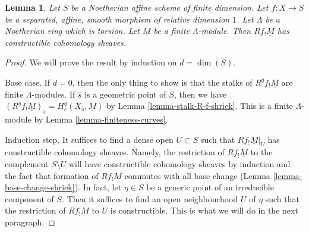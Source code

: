 \documentclass{stacks-project}
\theoremstyle{plain}
\newtheorem{lemma}[subsection]{Lemma}
\theoremstyle{definition}
\theoremstyle{remark}
\numberwithin{equation}{subsection}
\begin{document}
\begin{lemma}
\label{lemma-constant-shriek-rel-dim-1}
Let $S$ be a Noetherian affine scheme of finite dimension.
Let $f : X \to S$ be a separated, affine, smooth morphism
of relative dimension $1$. Let $\Lambda$ be a Noetherian ring
which is torsion. Let $M$ be a finite $\Lambda$-module.
Then $Rf_!\underline{M}$ has constructible cohomology sheaves.
\end{lemma}

\begin{proof}
We will prove the result by induction on $d = \dim(S)$.

\medskip\noindent
Base case. If $d = 0$, then the only thing to show is that the stalks
of $R^qf_!\underline{M}$ are finite $\Lambda$-modules.
If $\overline{s}$ is a geometric point of $S$, then we have
$(R^qf_!\underline{M})_{\overline{s}} = H^q_c(X_{\overline{s}}, \underline{M})$
by Lemma \ref{lemma-stalk-R-f-shriek}.
This is a finite $\Lambda$-module by Lemma \ref{lemma-finiteness-curves}.

\medskip\noindent
Induction step. It suffices to find a dense open $U \subset S$ such
that $Rf_!\underline{M}|_U$ has constructible cohomology sheaves.
Namely, the restriction of $Rf_!\underline{M}$ to the complement
$S \setminus U$ will have constructible cohomology sheaves by induction
and the fact that formation of $Rf_!\underline{M}$ commutes
with all base change (Lemma \ref{lemma-base-change-shriek}).
In fact, let $\eta \in S$ be a generic point of an irreducible
component of $S$. Then it suffices to find an open neighbourhood $U$
of $\eta$ such that the restriction of $Rf_!\underline{M}$
to $U$ is constructible. This is what we will do in the next paragraph.


\end{proof}
\end{document}
